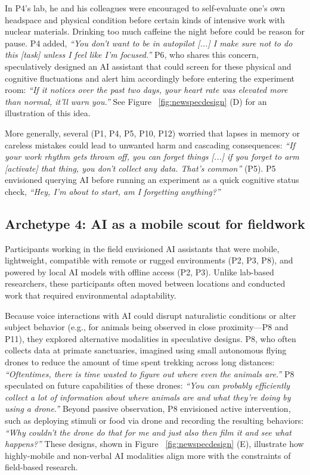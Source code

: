 In P4's lab, he and his colleagues were encouraged to self-evaluate one's own headspace and physical condition before certain kinds of intensive work with nuclear materials. Drinking too much caffeine the night before could be reason for pause. P4 added, \textit{``You don't want to be in autopilot [...] I make sure not to do this [task] unless I feel like I'm focused.''} P6, who shares this concern, speculatively designed an AI assistant that could screen for these physical and cognitive fluctuations and alert him accordingly before entering the experiment room: \textit{``If it notices over the past two days, your heart rate was elevated more than normal, it'll warn you.''} See Figure ~\ref{fig:newspecdesign} (D) for an illustration of this idea.

More generally, several  (P1, P4, P5, P10, P12) worried that lapses in memory or careless mistakes could lead to unwanted harm and cascading consequences: \textit{``If your work rhythm gets thrown off, you can forget things [...] if you forget to arm [activate] that thing, you don't collect any data. That's common''} (P5). P5 envisioned querying AI before running an experiment as a quick cognitive status check, \textit{``Hey, I'm about to start, am I forgetting anything?''}

\subsection{\textbf{Archetype 4: AI as a mobile scout for fieldwork}} Participants working in the field envisioned AI assistants that were mobile, lightweight, compatible with remote or rugged environments (P2, P3, P8), and powered by local AI models with offline access (P2, P3). Unlike lab-based researchers, these participants often moved between locations and conducted work that required environmental adaptability.

Because voice interactions with AI could disrupt naturalistic conditions or alter subject behavior (e.g., for animals being observed in close proximity---P8 and P11), they explored alternative modalities in speculative designs. P8, who often collects data at primate sanctuaries, imagined using small autonomous flying drones to reduce the amount of time spent trekking across long distances: \textit{``Oftentimes, there is time wasted to figure out where even the animals are.''} P8 speculated on future capabilities of these drones: \textit{``You can probably efficiently collect a lot of information about where animals are and what they're doing by using a drone.''} Beyond passive observation, P8 envisioned active intervention, such as deploying stimuli or food via drone and recording the resulting behaviors: \textit{``Why couldn't the drone do that for me and just also then film it and see what happens?''} These designs, shown in Figure ~\ref{fig:newspecdesign} (E), illustrate how highly-mobile and non-verbal AI modalities align more with the constraints of field-based research.


